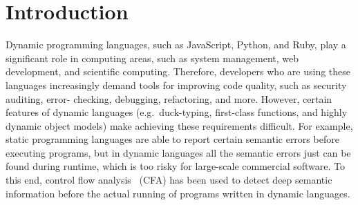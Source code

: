 \documentclass[12pt]{report}
\begin{document}
\beforepreface
\afterpreface

\chapter{Introduction}
\label{Introduction}
Dynamic programming languages, such as JavaScript, Python, and Ruby, play a significant role in computing areas, such as system management, web development, and scientific computing.
Therefore, developers who are using these languages increasingly demand tools for improving code quality, such as security auditing, error- checking, debugging, refactoring, and more.
However, certain features of dynamic languages (e.g.\ duck-typing, first-class functions, and highly dynamic object models) make achieving these requirements difficult.
For example, static programming languages are able to report certain semantic errors before executing programs, but in dynamic languages all the semantic errors just can be found during runtime, which is too risky for large-scale commercial software.
To this end, control flow analysis~\cite{midtgaard2012control}
 (CFA) has been used to detect deep semantic information before the actual running of programs written in dynamic languages.
\end{document}
